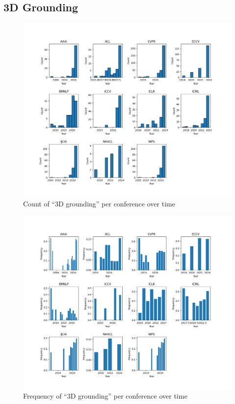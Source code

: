 \documentclass[11pt]{article}
\begin{document}
\subsection{3D Grounding}
\label{sec:appendix_word_sense_years_3d}
\begin{figure}[H]
  \includegraphics[width=0.75\columnwidth]{figs/grounding_figs/3D/split_by_conf_grounding_dist.png}
  \centering
  \caption{Count of ``3D grounding'' per conference over time}
  \label{fig:appendix_3d_all_confs_count}
\end{figure}

\begin{figure}[H]
  \includegraphics[width=0.75\columnwidth]{figs/freq_grounding_figs/3D/split_by_conf_grounding_dist.png}
  \centering
  \caption{Frequency of ``3D grounding'' per conference over time}
  \label{fig:appendix_3d_all_confs_freq}
\end{figure}
\end{document}
